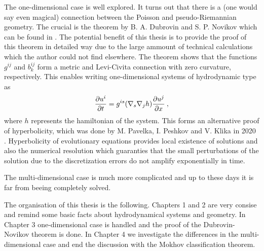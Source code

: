 The one-dimensional case is well explored. It turns out that there is a (one would say even magical) connection between the Poisson and pseudo-Riemannian geometry. The crucial is the theorem by B. A. Dubrovin and S. P. Novikov which can be found in \cite{Dubrovin-Novikov}. The potential benefit of this thesis is to provide the proof of this theorem in detailed way due to the large ammount of technical calculations which the author could not find elsewhere. The theorem shows that the functions $g^{ij}$ and $b^{ij}_k$ form a metric and Levi-Civita connection with zero curvature, respectively. This enables writing one-dimensional systems of hydrodynamic type as
\begin{align}
    \frac{\partial u^i}{\partial t} = g ^{i s} (\nabla_s \nabla_j h ) \frac{\partial u^j}{\partial x} \:,
\end{align}
where $h$ represents the hamiltonian of the system. This forms an alternative proof of hyperbolicity, which was done by M. Pavelka, I. Peshkov and V. Klika in 2020 \cite{Pavelka}. Hyperbolicity of evolutionary equations provides local existence of solutions and also the numerical resolution which guaranties that the small perturbations of the solution due to the discretization errors do not amplify exponentially in time.

The multi-dimensional case is much more complicated and up to these days it is far from beeing completely solved.

The organisation of this thesis is the following. Chapters 1 and 2 are very consise and remind some basic facts about hydrodynamical systems and geometry. In Chapter 3 one-dimensional case is handled and the proof of the Dubrovin-Novikov theorem is done. In Chapter 4 we investigate the differences in the multi-dimensional case and end the discussion with the Mokhov classification theorem.


